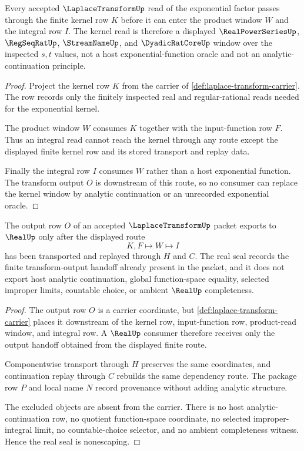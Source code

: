 \begin{theorem}
\label{thm:laplace-transform-exponential-kernel-window}
Every accepted $\LaplaceTransformUp$ read of the exponential factor passes through the finite kernel row $K$ before it can enter the product window $W$ and the integral row $I$. The kernel read is therefore a displayed $\RealPowerSeriesUp$, $\RegSeqRatUp$, $\StreamNameUp$, and $\DyadicRatCoreUp$ window over the inspected $s,t$ values, not a host exponential-function oracle and not an analytic-continuation principle.
\end{theorem}
\begin{proof}
Project the kernel row $K$ from the carrier of \autoref{def:laplace-transform-carrier}. The row records only the finitely inspected real and regular-rational reads needed for the exponential kernel.

The product window $W$ consumes $K$ together with the input-function row $F$. Thus an integral read cannot reach the kernel through any route except the displayed finite kernel row and its stored transport and replay data.

Finally the integral row $I$ consumes $W$ rather than a host exponential function. The transform output $O$ is downstream of this route, so no consumer can replace the kernel window by analytic continuation or an unrecorded exponential oracle.
\end{proof}

\begin{theorem}
\label{thm:laplace-transform-real-seal-nonescape}
The output row $O$ of an accepted $\LaplaceTransformUp$ packet exports to $\RealUp$ only after the displayed route
$$
K,F\longmapsto W\longmapsto I
$$
has been transported and replayed through $H$ and $C$. The real seal records the finite transform-output handoff already present in the packet, and it does not export host analytic continuation, global function-space equality, selected improper limits, countable choice, or ambient $\RealUp$ completeness.
\end{theorem}
\begin{proof}
The output row $O$ is a carrier coordinate, but \autoref{def:laplace-transform-carrier} places it downstream of the kernel row, input-function row, product-read window, and integral row. A $\RealUp$ consumer therefore receives only the output handoff obtained from the displayed finite route.

Componentwise transport through $H$ preserves the same coordinates, and continuation replay through $C$ rebuilds the same dependency route. The package row $P$ and local name $N$ record provenance without adding analytic structure.

The excluded objects are absent from the carrier. There is no host analytic-continuation row, no quotient function-space coordinate, no selected improper-integral limit, no countable-choice selector, and no ambient completeness witness. Hence the real seal is nonescaping.
\end{proof}

